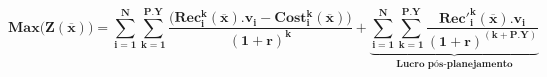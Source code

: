 \begin{equation}
  \nonumber
    \bm{
	  Max \big(Z(\overline{x})\big) =
	    \sum_{i=1}^N
	    \sum_{k=1}^{P.Y}
	    \frac
		  {\big( Rec_i^k(\overline{x}).v_i - Cost_i^k(\overline{x}) \big)}
	      {(1+r)^k}
		+
	    \underbrace{
	    \sum_{i=1}^N
	    \sum_{k=1}^{P.Y}
	    \frac
		  {{Rec'}_i^k(\overline{x}).v_i}
	      {(1+r)^{(k+P.Y)}}
		}_{\text{Lucro pós-planejamento}}
	}
  \label{eq:budget}
\end{equation}

\vfill
